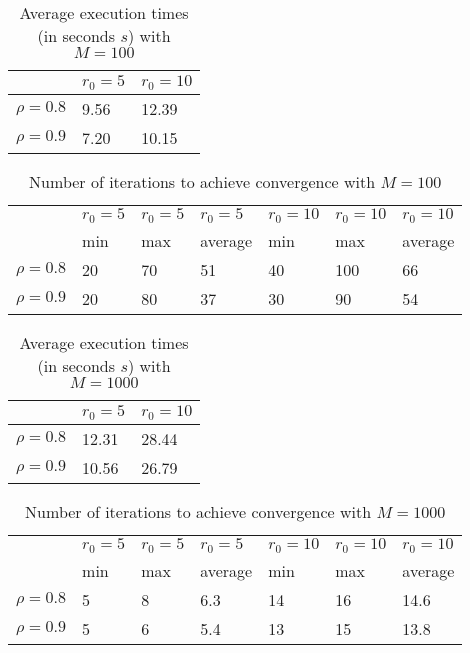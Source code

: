 \documentclass[a4paper,11pt,openright]{report}
\begin{document}
\begin{table}[H]
\centering
\addtolength{\leftskip}{-1.5cm}
\addtolength{\rightskip}{-1.5cm}
\begin{tabular}{|c|ll|}
\hline
$ $ & $r_0 = 5$ & $r_0 = 10$ \\
\hline
$\rho = 0.8$ & 9.56 & 12.39 \\
$\rho = 0.9$ & 7.20 & 10.15 \\
\hline
\end{tabular}
\caption{Average execution times (in seconds $s$) with $M = 100$}
\end{table}
\begin{table}[H]
\centering
\addtolength{\leftskip}{-1.5cm}
\addtolength{\rightskip}{-1.5cm}
\begin{tabular}{|c|llllll|}
\hline
$ $ & $r_0 = 5$ & $r_0 = 5$ & $r_0 = 5$ & $r_0 = 10$ & $r_0 = 10$ & $r_0 = 10$ \\
$ $ & min & max & average & min & max & average \\
\hline
$\rho = 0.8$ & 20 & 70 & 51 & 40 & 100 & 66 \\
$\rho = 0.9$ & 20 & 80 & 37 & 30 & 90 & 54 \\
\hline
\end{tabular}
\caption{Number of iterations to achieve convergence with $M = 100$}
\end{table}
\begin{table}[H]
\centering
\addtolength{\leftskip}{-1.5cm}
\addtolength{\rightskip}{-1.5cm}
\begin{tabular}{|c|ll|}
\hline
$ $ & $r_0 = 5$ & $r_0 = 10$ \\
\hline
$\rho = 0.8$ & 12.31 & 28.44 \\
$\rho = 0.9$ & 10.56 & 26.79 \\
\hline
\end{tabular}
\caption{Average execution times (in seconds $s$) with $M = 1000$}
\end{table}
\begin{table}[H]
\centering
\addtolength{\leftskip}{-1.5cm}
\addtolength{\rightskip}{-1.5cm}
\begin{tabular}{|c|llllll|}
\hline
$ $ & $r_0 = 5$ & $r_0 = 5$ & $r_0 = 5$ & $r_0 = 10$ & $r_0 = 10$ & $r_0 = 10$ \\
$ $ & min & max & average & min & max & average \\
\hline
$\rho = 0.8$ & 5 & 8 & 6.3 & 14 & 16 & 14.6 \\
$\rho = 0.9$ & 5 & 6 & 5.4 & 13 & 15 & 13.8 \\
\hline
\end{tabular}
\caption{Number of iterations to achieve convergence with $M = 1000$}
\end{table}
\newpage
\end{document}
